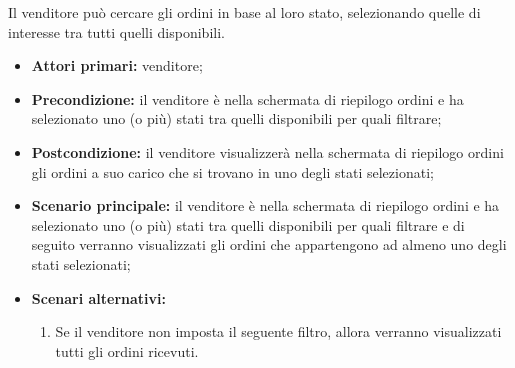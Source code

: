 Il venditore può cercare gli ordini in base al loro stato, selezionando quelle di interesse tra tutti quelli disponibili.
\begin{itemize}
	\item \textbf{Attori primari:} venditore;
	\item \textbf{Precondizione:} il venditore è nella schermata di riepilogo ordini e ha selezionato uno (o più) stati tra quelli disponibili per quali filtrare;
	\item \textbf{Postcondizione:} il venditore visualizzerà nella schermata di riepilogo ordini gli ordini a suo carico che si trovano in uno degli stati selezionati;
	\item \textbf{Scenario principale:} il venditore è nella schermata di riepilogo ordini e ha selezionato uno (o più) stati tra quelli disponibili per quali filtrare e di seguito verranno visualizzati gli ordini che appartengono ad almeno uno degli stati selezionati;
	\item \textbf{Scenari alternativi:}
	\begin{enumerate}[label=\lett]
		\item Se il venditore non imposta il seguente filtro, allora verranno visualizzati tutti gli ordini ricevuti.
	\end{enumerate}
\end{itemize}

